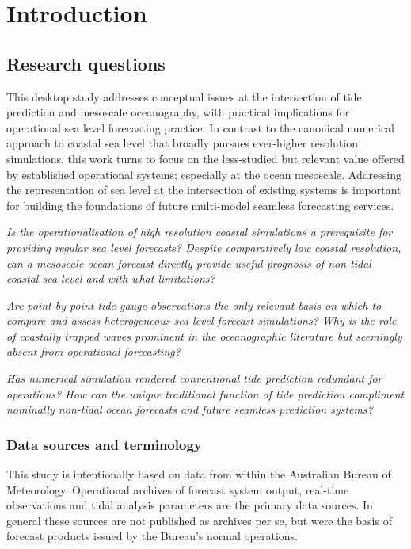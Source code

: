 \chapter{Introduction}
\section{Research questions}
This desktop study addresses conceptual issues at the intersection of tide prediction and mesoscale oceanography, with practical implications for operational sea level forecasting practice. 
In contrast to the canonical numerical approach to coastal sea level that broadly pursues  ever-higher resolution simulations, this work turns to focus on the less-studied but relevant value offered by established operational systems; especially at the ocean mesoscale. Addressing the representation of sea level at the intersection of existing systems is important for building the foundations of future multi-model seamless forecasting services.


\emph{%
Is the operationalisation of high resolution coastal simulations a prerequisite for providing regular sea level forecasts?  Despite comparatively low coastal resolution, can a mesoscale ocean forecast directly provide useful prognosis of non-tidal coastal sea level and with what limitations? }



\emph{Are point-by-point tide-gauge observations the only relevant basis on which to compare and assess heterogeneous sea level forecast simulations? 
Why is the role of coastally trapped waves prominent in the oceanographic literature but seemingly absent from operational forecasting?}



\emph{Has numerical simulation rendered conventional tide prediction redundant for operations?  How can the unique traditional function of tide prediction compliment nominally non-tidal ocean forecasts and future seamless prediction systems? 
}


\subsection{Data sources and terminology}
This study is intentionally based on data from within the Australian Bureau of Meteorology.
Operational archives of forecast system output, real-time observations and tidal analysis parameters are the primary data sources. In general these sources are not published as archives per se, but were the basis of forecast products issued by the Bureau's normal operations.

